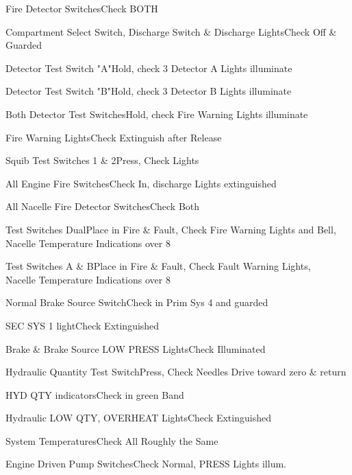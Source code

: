 \documentclass[sim-use, blue_items]{checklist}
\begin{document}
\begin{continuedchecklist}
	 {
		\item{Fire Detector Switches}{Check BOTH}
		\item{Compartment Select Switch, Discharge Switch \& Discharge Lights}{Check Off \& Guarded}
		\item{Detector Test Switch "A"}{Hold, check 3 Detector A Lights illuminate}	
		\item{Detector Test Switch "B"}{Hold, check 3 Detector B Lights illuminate}	
		\item{Both Detector Test Switches}{Hold, check Fire Warning Lights illuminate}
		\item{Fire Warning Lights}{Check Extinguish after Release}
		\item{Squib Test Switches 1 \& 2}{Press, Check Lights}
	}
	 {
		\item{All Engine Fire Switches}{Check In, discharge Lights extinguished}
		\item{All Nacelle Fire Detector Switches}{Check Both}
		\item{Test Switches Dual}{Place in Fire \& Fault, Check Fire Warning Lights and Bell,\\Nacelle Temperature Indications over 8}
		\item{Test Switches A \& B}{Place in Fire \& Fault, Check Fault Warning Lights,\\Nacelle Temperature Indications over 8}
	}
	 {
		\item{Normal Brake Source Switch}{Check in Prim Sys 4 and guarded}
		\item{SEC SYS 1 light}{Check Extinguished}
		\item{Brake \& Brake Source LOW PRESS Lights}{Check Illuminated}
		\item{Hydraulic Quantity Test Switch}{Press, Check Needles Drive toward zero \& return}
		\item{HYD QTY indicators}{Check in green Band}
		\item{Hydraulic LOW QTY, OVERHEAT Lights}{Check Extinguished}
		\item{System Temperatures}{Check All Roughly the Same}
		\item{Engine Driven Pump Switches}{Check Normal, PRESS Lights illum.}
	}

\end{continuedchecklist}
\end{document}
